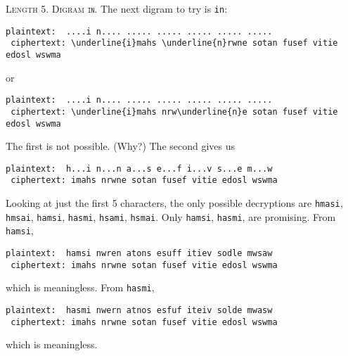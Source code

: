 \textsc{Length 5. Digram \texttt{in}.}
The next digram to try is \verb!in!:
\begin{Verbatim}[commandchars=\\\{\}]
 plaintext:  ....i n.... ..... ..... ..... ..... .....
 ciphertext: \underline{i}mahs \underline{n}rwne sotan fusef vitie edosl wswma
\end{Verbatim}
or
\begin{Verbatim}[commandchars=\\\{\}]
 plaintext:  ....i n.... ..... ..... ..... ..... .....
 ciphertext: \underline{i}mahs nrw\underline{n}e sotan fusef vitie edosl wswma
\end{Verbatim}
The first is not possible. (Why?)
The second gives us
\begin{Verbatim}[commandchars=\\\{\}]
 plaintext:  h...i n...n a...s e...f i...v s...e m...w
 ciphertext: imahs nrwne sotan fusef vitie edosl wswma
\end{Verbatim}
Looking at just the first 5 characters,
the only possible decryptions are
\verb!hmasi!,
\verb!hmsai!,
\verb!hamsi!,
\verb!hasmi!,
\verb!hsami!,
\verb!hsmai!.
Only
\verb!hamsi!,
\verb!hasmi!,
are promising.
From \verb!hamsi!,
\begin{Verbatim}[commandchars=\\\{\}]
 plaintext:  hamsi nwren atons esuff itiev sodle mwsaw
 ciphertext: imahs nrwne sotan fusef vitie edosl wswma
\end{Verbatim}
which is meaningless.
From \verb!hasmi!,
\begin{Verbatim}[commandchars=\\\{\}]
 plaintext:  hasmi nwern atnos esfuf iteiv solde mwasw
 ciphertext: imahs nrwne sotan fusef vitie edosl wswma
\end{Verbatim}
which is meaningless.

